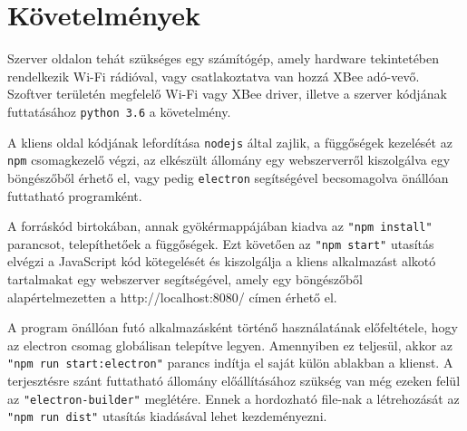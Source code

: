 \section{Követelmények}

Szerver oldalon tehát szükséges egy számítógép, amely hardware tekintetében
rendelkezik Wi-Fi rádióval, vagy csatlakoztatva van hozzá XBee adó-vevő.
Szoftver területén megfelelő Wi-Fi vagy XBee driver, illetve a szerver
kódjának futtatásához \verb|python 3.6| a követelmény.

A kliens oldal kódjának lefordítása \verb|nodejs| által zajlik, a függőségek
kezelését az \verb|npm| csomagkezelő végzi, az elkészült állomány egy
webszerverről kiszolgálva egy böngészőből érhető el, vagy pedig \verb|electron|
segítségével becsomagolva önállóan futtatható programként.

A forráskód birtokában, annak gyökérmappájában kiadva az \verb|"npm install"|
parancsot, telepíthetőek a függőségek. Ezt követően az \verb|"npm start"|
utasítás elvégzi a JavaScript kód kötegelését és kiszolgálja a kliens
alkalmazást alkotó tartalmakat egy webszerver segítségével, amely egy
böngészőből alapértelmezetten a http://localhost:8080/ címen érhető el.

A program önállóan futó alkalmazásként történő használatának előfeltétele, hogy
az electron csomag globálisan telepítve legyen. Amennyiben ez teljesül, akkor az
\verb|"npm run start:electron"| parancs indítja el saját külön ablakban a
klienst. A terjesztésre szánt futtatható állomány előállításához szükség van még
ezeken felül az \verb|"electron-builder"| meglétére. Ennek a hordozható file-nak
a létrehozását az \verb|"npm run dist"| utasítás kiadásával lehet kezdeményezni.

